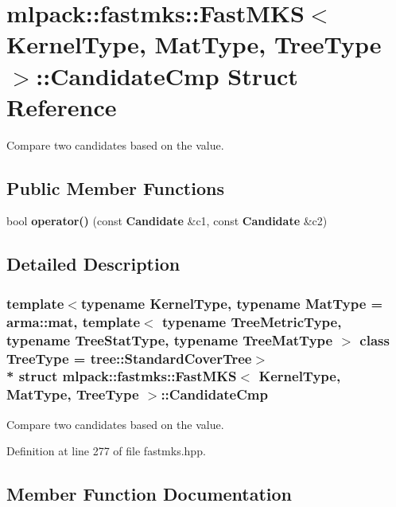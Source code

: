 \section{mlpack\+:\+:fastmks\+:\+:Fast\+M\+KS$<$ Kernel\+Type, Mat\+Type, Tree\+Type $>$\+:\+:Candidate\+Cmp Struct Reference}
\label{structmlpack_1_1fastmks_1_1FastMKS_1_1CandidateCmp}


Compare two candidates based on the value.  


\subsection*{Public Member Functions}
\begin{DoxyCompactItemize}
\item 
bool {\bf operator()} (const {\bf Candidate} \&c1, const {\bf Candidate} \&c2)
\end{DoxyCompactItemize}


\subsection{Detailed Description}
\subsubsection*{template$<$typename Kernel\+Type, typename Mat\+Type = arma\+::mat, template$<$ typename Tree\+Metric\+Type, typename Tree\+Stat\+Type, typename Tree\+Mat\+Type $>$ class Tree\+Type = tree\+::\+Standard\+Cover\+Tree$>$\\*
struct mlpack\+::fastmks\+::\+Fast\+M\+K\+S$<$ Kernel\+Type, Mat\+Type, Tree\+Type $>$\+::\+Candidate\+Cmp}

Compare two candidates based on the value. 

Definition at line 277 of file fastmks.\+hpp.



\subsection{Member Function Documentation}
